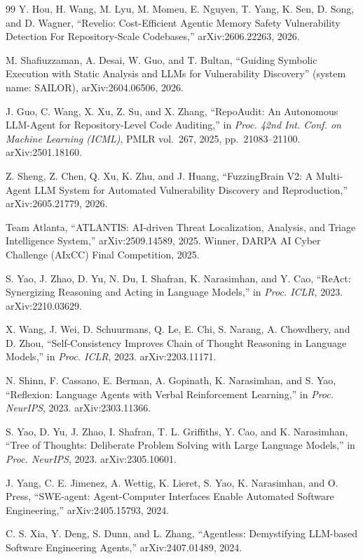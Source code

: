 \documentclass[11pt,a4paper]{article}
\begin{document}
\begin{thebibliography}{99}
 Y. Hou, H. Wang, M. Lyu, M. Momeu, E. Nguyen, T. Yang, K. Sen, D. Song, and D. Wagner, ``Revelio: Cost-Efficient Agentic Memory Safety Vulnerability Detection For Repository-Scale Codebases,'' arXiv:2606.22263, 2026.

 M. Shafiuzzaman, A. Desai, W. Guo, and T. Bultan, ``Guiding Symbolic Execution with Static Analysis and LLMs for Vulnerability Discovery'' (system name: SAILOR), arXiv:2604.06506, 2026.

 J. Guo, C. Wang, X. Xu, Z. Su, and X. Zhang, ``RepoAudit: An Autonomous LLM-Agent for Repository-Level Code Auditing,'' in \textit{Proc. 42nd Int. Conf. on Machine Learning (ICML)}, PMLR vol.~267, 2025, pp.~21083--21100. arXiv:2501.18160.

 Z. Sheng, Z. Chen, Q. Xu, K. Zhu, and J. Huang, ``FuzzingBrain V2: A Multi-Agent LLM System for Automated Vulnerability Discovery and Reproduction,'' arXiv:2605.21779, 2026.

 Team Atlanta, ``ATLANTIS: AI-driven Threat Localization, Analysis, and Triage Intelligence System,'' arXiv:2509.14589, 2025. Winner, DARPA AI Cyber Challenge (AIxCC) Final Competition, 2025.

 S. Yao, J. Zhao, D. Yu, N. Du, I. Shafran, K. Narasimhan, and Y. Cao, ``ReAct: Synergizing Reasoning and Acting in Language Models,'' in \textit{Proc. ICLR}, 2023. arXiv:2210.03629.

 X. Wang, J. Wei, D. Schuurmans, Q. Le, E. Chi, S. Narang, A. Chowdhery, and D. Zhou, ``Self-Consistency Improves Chain of Thought Reasoning in Language Models,'' in \textit{Proc. ICLR}, 2023. arXiv:2203.11171.

 N. Shinn, F. Cassano, E. Berman, A. Gopinath, K. Narasimhan, and S. Yao, ``Reflexion: Language Agents with Verbal Reinforcement Learning,'' in \textit{Proc. NeurIPS}, 2023. arXiv:2303.11366.

 S. Yao, D. Yu, J. Zhao, I. Shafran, T. L. Griffiths, Y. Cao, and K. Narasimhan, ``Tree of Thoughts: Deliberate Problem Solving with Large Language Models,'' in \textit{Proc. NeurIPS}, 2023. arXiv:2305.10601.

 J. Yang, C. E. Jimenez, A. Wettig, K. Lieret, S. Yao, K. Narasimhan, and O. Press, ``SWE-agent: Agent-Computer Interfaces Enable Automated Software Engineering,'' arXiv:2405.15793, 2024.

 C. S. Xia, Y. Deng, S. Dunn, and L. Zhang, ``Agentless: Demystifying LLM-based Software Engineering Agents,'' arXiv:2407.01489, 2024.


\end{thebibliography}
\end{document}
